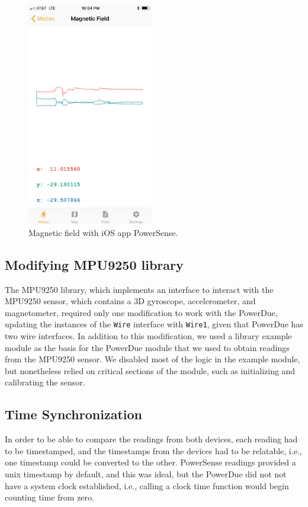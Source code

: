 \documentclass[journal]{IEEEtranTIE}
\begin{document}
\begin{figure}[!t]\centering
	\includegraphics[width=5.5cm]{magnetic_field}
	\caption{Magnetic field with iOS app PowerSense.}\label{fig:fig3}
\end{figure}

\subsection{Modifying MPU9250 library}

The MPU9250 library, which implements an interface to interact with the MPU9250
sensor, which contains a 3D gyroscope, accelerometer, and magnetometer, required
only one modification to work with the PowerDue, updating the instances of the
\texttt{Wire} interface with \texttt{Wire1}, given that PowerDue has two wire
interfaces. In addition to this modification, we used a library example module
\cite{MPU9250Ex} as the basis for the PowerDue module that we used to obtain
readings from the MPU9250 sensor. We disabled most of the logic in the example
module, but nonetheless relied on critical sections of the module, such as
initializing and calibrating the sensor.

\subsection{Time Synchronization}

In order to be able to compare the readings from both devices, each reading had
to be timestamped, and the timestamps from the devices had to be relatable,
i.e., one timestamp could be converted to the other. PowerSense readings
provided a unix timestamp by default, and this was ideal, but the PowerDue did
not not have a system clock established, i.e., calling a clock time function
would begin counting time from zero.
\end{document}

